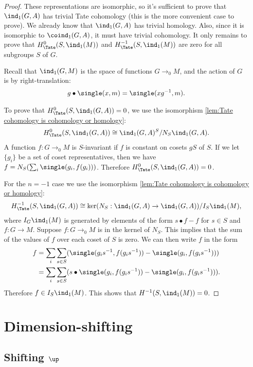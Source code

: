 \begin{proof}
	\leanok

	These representations are isomorphic, so it's
	sufficient to prove that $\ind_1(G,A)$ has trivial Tate cohomology
	(this is the more convenient case to prove).
	We already know that $\ind_1(G,A)$ has trivial homology.
	Also, since it is isomorphic to $\coind_1(G,A)$, it must have trivial cohomology.
	It only remains to prove that $H^0_{\Tate}(S,\ind_1(M))$
	and $H^{-1}_{\Tate}(S,\ind_1(M))$ are zero	for all subgroups $S$ of $G$.

	Recall that $\ind_1(G,M)$ is the space of functions $G \to_0 M$, and the action of $G$ is by
	right-translation:
	\[
		g \bullet \single(x,m) = \single(xg^{-1},m).
	\]

	To prove that $H^0_{\Tate}(S,\ind_1(G,A))=0$, we use the isomorphism
	\ref{lem:Tate cohomology is cohomology or homology}:
	\[
		H^0_{\Tate}(S,\ind_1(G,A)) \cong \ind_1(G,A)^S / N_S \ind_1(G,A).
	\]
	A function $f : G \to_0 M$ is $S$-invariant if $f$ is constant on cosets $gS$ of $S$.
	If we let $\{g_i\}$ be a set of coset representatives,
	then we have $f = N_S (\sum_i \single(g_i, f(g_i)))$.
	Therefore $H^0_{\Tate}(S,\ind_1(G,A))=0$.

	For the $n=-1$ case we use the isomorphism \ref{lem:Tate cohomology is cohomology or homology}:
	\[
		H^{-1}_{\Tate}(S,\ind_1(G,A))
		\cong
		\ker(N_S : \ind_1(G,A) \to \ind_1(G,A)) / I_S \ind_1(M),
	\]
	where $I_G \ind_1(M)$ is generated by elements of the form $s \bullet f - f$ for $s \in S$
	and $f : G \to M$.
	Suppose $f:G \to_0 M$ is in the kernel of $N_S$.
	This implies that the sum of the values of $f$ over each coset of $S$ is zero.
	We can then write $f$ in the form
	\begin{align*}
		f
		& = \sum_i \sum_{s \in S} (\single(g_i s^{-1}, f(g_is^{-1})) - \single(g_i,f(g_is^{-1})))\\
		& = \sum_i \sum_{s \in S} (s \bullet \single(g_i, f(g_is^{-1})) - \single(g_i,f(g_is^{-1}))).
	\end{align*}
	Therefore $f \in I_S \ind_1(M)$. This shows that $H^{-1}(S,\ind_1(M)) = 0$.
\end{proof}





\section{Dimension-shifting}

\subsection{Shifting \texorpdfstring{$\up$}{up}}

